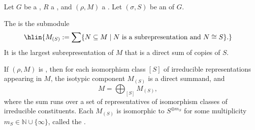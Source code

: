 \begin{definition} \label{definition:isotypic_component_of_a_representation_of_a_group_on_a_left_module_over_a_ring_for_an_irreducible_representation}

    Let $G$ be a , $R$ a , and $(\rho, M)$ a . Let $(\sigma, S)$ be an  of $G$.

    The  is the submodule
    $$\hlin{M_{(S)} := \sum \{N \subseteq M \mid N \text{ is a subrepresentation and } N \cong S\}.}$$
    It is the largest subrepresentation of $M$ that is a direct sum of copies of $S$.

    If $(\rho, M)$ is , then for each isomorphism class $[S]$ of irreducible representations appearing in $M$, the isotypic component $M_{(S)}$ is a direct summand, and
    $$ M = \bigoplus_{[S]} M_{(S)},$$
    where the sum runs over a set of representatives of isomorphism classes of irreducible constituents. Each $M_{(S)}$ is isomorphic to $S^{\oplus m_S}$ for some multiplicity $m_S \in \mathbb{N} \cup \{\infty\}$, called the .
\end{definition}
